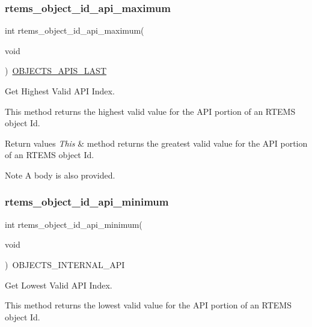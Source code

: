 \subsubsection{\texorpdfstring{rtems\_object\_id\_api\_maximum}{rtems\_object\_id\_api\_maximum}}
{\footnotesize\ttfamily int rtems\+\_\+object\+\_\+id\+\_\+api\+\_\+maximum(\begin{DoxyParamCaption}\item[{}]{void }\end{DoxyParamCaption})~\mbox{\hyperlink{group__RTEMSScoreObject_ga238bef3e73c68907c9fbc51497250c13}{O\+B\+J\+E\+C\+T\+S\+\_\+\+A\+P\+I\+S\+\_\+\+L\+A\+ST}}}



Get Highest Valid A\+PI Index. 

This method returns the highest valid value for the A\+PI portion of an R\+T\+E\+MS object Id.


\begin{DoxyRetVals}{Return values}
{\em This} & method returns the greatest valid value for the A\+PI portion of an R\+T\+E\+MS object Id.\\
\hline
\end{DoxyRetVals}
\begin{DoxyNote}{Note}
A body is also provided. 
\end{DoxyNote}
\mbox{\label{group__ClassicClassInfo_gad8673b7734f578045d2168db1752b917}} 
\subsubsection{\texorpdfstring{rtems\_object\_id\_api\_minimum}{rtems\_object\_id\_api\_minimum}}
{\footnotesize\ttfamily int rtems\+\_\+object\+\_\+id\+\_\+api\+\_\+minimum(\begin{DoxyParamCaption}\item[{}]{void }\end{DoxyParamCaption})~O\+B\+J\+E\+C\+T\+S\+\_\+\+I\+N\+T\+E\+R\+N\+A\+L\+\_\+\+A\+PI}



Get Lowest Valid A\+PI Index. 

This method returns the lowest valid value for the A\+PI portion of an R\+T\+E\+MS object Id.


